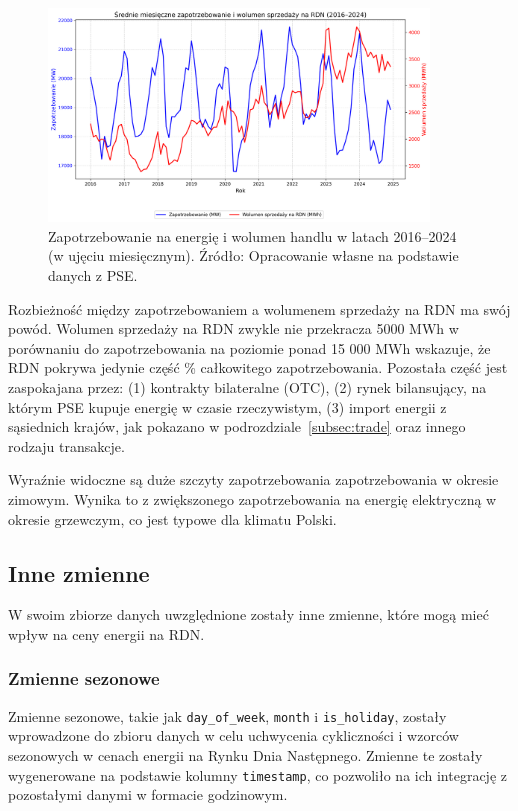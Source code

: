 \begin{figure}[H]
    \centering
    \includegraphics[width=0.9\textwidth]{../plots/market/load_vs_volume_2016_2024.png}
    \caption{Zapotrzebowanie na energię i wolumen handlu w latach 2016--2024 (w ujęciu miesięcznym). Źródło: Opracowanie własne na podstawie danych z PSE.}
    \label{fig:load_vs_trade_volume}
\end{figure}

Rozbieżność między zapotrzebowaniem a wolumenem sprzedaży na RDN ma swój powód. Wolumen sprzedaży na RDN zwykle nie przekracza 5000 MWh w porównaniu do zapotrzebowania na poziomie ponad 15 000  MWh wskazuje, że RDN pokrywa jedynie część \% całkowitego zapotrzebowania. Pozostała część jest zaspokajana przez: (1) kontrakty bilateralne (OTC), (2) rynek bilansujący, na którym PSE kupuje energię w czasie rzeczywistym, (3) import energii z sąsiednich krajów, jak pokazano w podrozdziale~\ref{subsec:trade} oraz innego rodzaju transakcje. 

Wyraźnie widoczne są duże szczyty zapotrzebowania zapotrzebowania w okresie zimowym. Wynika to z zwiększonego zapotrzebowania na energię elektryczną w okresie grzewczym, co jest typowe dla klimatu Polski.

\subsection{Inne zmienne}
\label{subsec:seasonal}

W swoim zbiorze danych uwzględnione zostały inne zmienne, które mogą mieć wpływ na ceny energii na RDN.

\subsubsection{Zmienne sezonowe}
\label{subsubsec:seasonal_variables}
Zmienne sezonowe, takie jak \texttt{day\_of\_week}, \texttt{month} i \texttt{is\_holiday}, zostały wprowadzone do zbioru danych w celu uchwycenia cykliczności i wzorców sezonowych w cenach energii na Rynku Dnia Następnego. Zmienne te zostały wygenerowane na podstawie kolumny \texttt{timestamp}, co pozwoliło na ich integrację z pozostałymi danymi w formacie godzinowym.

